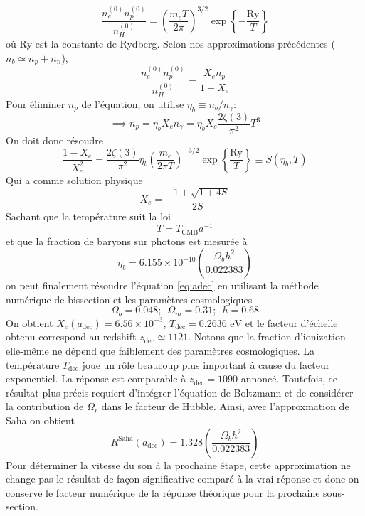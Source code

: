 \documentclass{article}
\numberwithin{equation}{section}
\begin{document}
\[
        \frac{n_e^{(0)} n_p^{(0)}}{n_H^{(0)}} 
        = \left( \frac{m_e T}{2 \pi} \right)^{3/2}
        \exp \left\{ -\frac{\text{Ry}}{T} \right\} 
\]
où $\text{Ry}$ est la constante de Rydberg.
Selon nos approximations précédentes ($n_b \simeq n_p + n_n$),
\[
        \frac{n_e^{(0)} n_p^{(0)}}{n_H^{(0)}}
        = \frac{X_en_p}{1 - X_e}
\]
Pour éliminer $n_p$ de l'équation, on utilise $\eta_b \equiv n_b / n_\gamma$:
\[
        \implies n_p = \eta_b X_e n_\gamma = \eta_b X_e\frac{2 \zeta(3)}{\pi^2}T^3
\]
On doit donc résoudre
\[
        \frac{1 - X_e}{X_e^2} = \frac{2 \zeta(3)}{\pi^2}\eta_b \left( \frac{m_e}{2 \pi T} \right)^{-3/2}
        \exp \left\{ \frac{\text{Ry}}{T} \right\} \equiv S(\eta_b, T)
\]
Qui a comme solution physique
\[
        X_e = \frac{-1 + \sqrt{1 + 4S}}{2S}
\]
Sachant que la température suit la loi
\[
        T = T_{\text{CMB}}a^{-1}
\]
et que la fraction de baryons sur photons est mesurée à
\[
        \eta_b = 6.155\times 10^{-10} \left( \frac{\Omega_b h^2}{0.022383} \right)
\]
on peut finalement résoudre l'équation \ref{eq:adec} en utilisant la 
méthode numérique de bissection et les paramètres cosmologiques 
\[
        \Omega_b = 0.048;\,\,\, \Omega_m = 0.31;\,\,\,h=0.68
\]
On obtient $X_e(a_{\text{dec}}) = 6.56\times 10^{-3}$, $T_{\text{dec}} = 0.2636\,\,\text{eV}$ 
et le facteur d'échelle 
obtenu correspond 
au redshift $z_{\text{dec}} \simeq 1121$. Notons que la fraction d'ionization 
elle-même ne dépend que faiblement des paramètres cosmologiques. La température $T_{\text{dec}}$
joue un rôle beaucoup plus important à cause du facteur exponentiel. 
La réponse est comparable à
$z_{\text{dec}} = 1090$ annoncé. Toutefois, ce résultat plus précis 
requiert d'intégrer l'équation de 
Boltzmann et de considérer la contribution de $\Omega_r$ 
dans le facteur de Hubble. Ainsi, avec l'approxmation de Saha on obtient
\[
        \boxed{R^{\text{Saha}}(a_{\text{dec}}) = 1.328 \left( \frac{\Omega_b h^2}{0.022383} \right)}
\]
Pour déterminer la vitesse du son à la prochaine étape, cette approximation ne change 
pas le résultat de façon significative comparé à la vrai réponse et donc on conserve 
le facteur numérique de la réponse théorique pour la prochaine sous-section.
\end{document}
